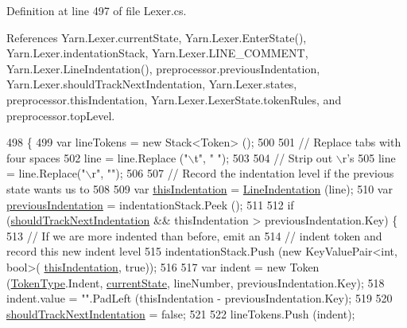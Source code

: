 Definition at line 497 of file Lexer.\-cs.



References Yarn.\-Lexer.\-current\-State, Yarn.\-Lexer.\-Enter\-State(), Yarn.\-Lexer.\-indentation\-Stack, Yarn.\-Lexer.\-L\-I\-N\-E\-\_\-\-C\-O\-M\-M\-E\-N\-T, Yarn.\-Lexer.\-Line\-Indentation(), preprocessor.\-previous\-Indentation, Yarn.\-Lexer.\-should\-Track\-Next\-Indentation, Yarn.\-Lexer.\-states, preprocessor.\-this\-Indentation, Yarn.\-Lexer.\-Lexer\-State.\-token\-Rules, and preprocessor.\-top\-Level.


\begin{DoxyCode}
498         \{
499             var lineTokens = \textcolor{keyword}{new} Stack<Token> ();
500 
501             \textcolor{comment}{// Replace tabs with four spaces}
502             line = line.Replace (\textcolor{stringliteral}{"\(\backslash\)t"}, \textcolor{stringliteral}{"    "});
503 
504             \textcolor{comment}{// Strip out \(\backslash\)r's}
505             line = line.Replace(\textcolor{stringliteral}{"\(\backslash\)r"}, \textcolor{stringliteral}{""});
506 
507             \textcolor{comment}{// Record the indentation level if the previous state wants us to}
508 
509             var \hyperlink{a00348_a0e59365a4aa5811f6495b92a51e23573}{thisIndentation} = \hyperlink{a00127_a4079b10b099e5d85f5482f9e7eac4179}{LineIndentation} (line);
510             var \hyperlink{a00348_ade44b858578c3eab7b6f90030a0e3ea1}{previousIndentation} = indentationStack.Peek ();
511 
512             \textcolor{keywordflow}{if} (\hyperlink{a00127_ac670aac2245cbd4694dfbd5b69313218}{shouldTrackNextIndentation} && thisIndentation > 
      previousIndentation.Key) \{
513                 \textcolor{comment}{// If we are more indented than before, emit an}
514                 \textcolor{comment}{// indent token and record this new indent level}
515                 indentationStack.Push (\textcolor{keyword}{new} KeyValuePair<int, bool>(
      \hyperlink{a00348_a0e59365a4aa5811f6495b92a51e23573}{thisIndentation}, \textcolor{keyword}{true}));
516 
517                 var indent = \textcolor{keyword}{new} Token (\hyperlink{a00051_a301aa7c866593a5b625a8fc158bbeace}{TokenType}.Indent, \hyperlink{a00127_ac90b7dce8103425a148f9e8588f14137}{currentState}, lineNumber, 
      previousIndentation.Key);
518                 indent.value = \textcolor{stringliteral}{""}.PadLeft (thisIndentation - previousIndentation.Key);
519 
520                 \hyperlink{a00127_ac670aac2245cbd4694dfbd5b69313218}{shouldTrackNextIndentation} = \textcolor{keyword}{false};
521 
522                 lineTokens.Push (indent);

\end{DoxyCode}
